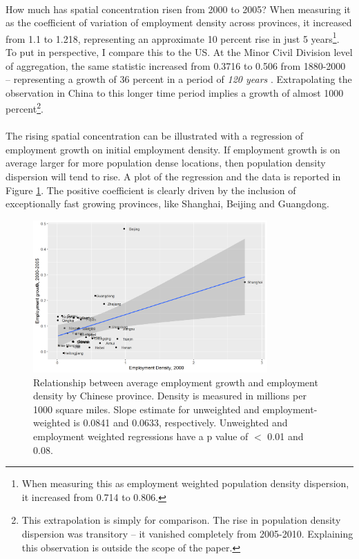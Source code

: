 \documentclass[]{article}
\theoremstyle{plain}
\begin{document}
\paragraph*{}
How much has spatial concentration risen from 2000 to 2005? When measuring it as the coefficient of variation of employment density across provinces, it increased from 1.1 to 1.218, representing an approximate 10 percent rise in just 5 years\footnote{When measuring this as employment weighted population density dispersion, it increased from 0.714 to 0.806.}. To put in perspective, I compare this to the US. At the Minor Civil Division level of aggregation, the same statistic increased from 0.3716 to 0.506 from 1880-2000 -- representing a growth of 36 percent in a period of \textit{120 years} \citep{urbstruct}. Extrapolating the observation in China to this longer time period implies a growth of almost 1000 percent\footnote{This extrapolation is simply for comparison. The rise in population density dispersion was transitory -- it vanished completely from 2005-2010. Explaining this observation is outside the scope of the paper.}. 

\paragraph*{}
The rising spatial concentration can be illustrated with a regression of employment growth on initial employment density. If employment growth is on average larger for more population dense locations, then population density dispersion will tend to rise. A plot of the regression and the data is reported in Figure \ref{fig:emp_dens_growth}. The positive coefficient is clearly driven by the inclusion of exceptionally fast growing provinces, like Shanghai, Beijing and Guangdong. 

\begin{center}
\begin{figure}[h]
	\centering
	\includegraphics[width=0.8\textwidth]{emp_growth_density.png}
	\caption{Relationship between average employment growth and employment density by Chinese province. Density is measured in millions per 1000 square miles. Slope estimate for unweighted and employment-weighted is 0.0841 and 0.0633, respectively.  Unweighted and employment weighted regressions have a p value of $<$ 0.01 and 0.08.}
	\label{fig:emp_dens_growth}
\end{figure}
\end{center}
\end{document}
